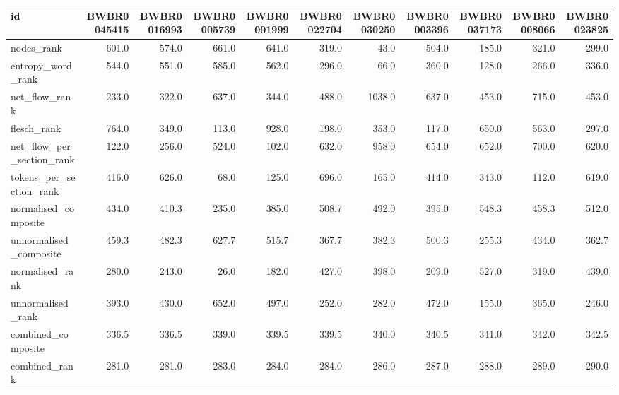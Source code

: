 \begin{tabular}{lrrrrrrrrrr}
\toprule
id & BWBR0045415 & BWBR0016993 & BWBR0005739 & BWBR0001999 & BWBR0022704 & BWBR0030250 & BWBR0003396 & BWBR0037173 & BWBR0008066 & BWBR0023825 \\
\midrule
nodes\_rank & 601.0 & 574.0 & 661.0 & 641.0 & 319.0 & 43.0 & 504.0 & 185.0 & 321.0 & 299.0 \\
\cline{1-11}
entropy\_word\_rank & 544.0 & 551.0 & 585.0 & 562.0 & 296.0 & 66.0 & 360.0 & 128.0 & 266.0 & 336.0 \\
\cline{1-11}
net\_flow\_rank & 233.0 & 322.0 & 637.0 & 344.0 & 488.0 & 1038.0 & 637.0 & 453.0 & 715.0 & 453.0 \\
\cline{1-11}
flesch\_rank & 764.0 & 349.0 & 113.0 & 928.0 & 198.0 & 353.0 & 117.0 & 650.0 & 563.0 & 297.0 \\
\cline{1-11}
net\_flow\_per\_section\_rank & 122.0 & 256.0 & 524.0 & 102.0 & 632.0 & 958.0 & 654.0 & 652.0 & 700.0 & 620.0 \\
\cline{1-11}
tokens\_per\_section\_rank & 416.0 & 626.0 & 68.0 & 125.0 & 696.0 & 165.0 & 414.0 & 343.0 & 112.0 & 619.0 \\
\cline{1-11}
normalised\_composite & 434.0 & 410.3 & 235.0 & 385.0 & 508.7 & 492.0 & 395.0 & 548.3 & 458.3 & 512.0 \\
\cline{1-11}
unnormalised\_composite & 459.3 & 482.3 & 627.7 & 515.7 & 367.7 & 382.3 & 500.3 & 255.3 & 434.0 & 362.7 \\
\cline{1-11}
normalised\_rank & 280.0 & 243.0 & 26.0 & 182.0 & 427.0 & 398.0 & 209.0 & 527.0 & 319.0 & 439.0 \\
\cline{1-11}
unnormalised\_rank & 393.0 & 430.0 & 652.0 & 497.0 & 252.0 & 282.0 & 472.0 & 155.0 & 365.0 & 246.0 \\
\cline{1-11}
combined\_composite & 336.5 & 336.5 & 339.0 & 339.5 & 339.5 & 340.0 & 340.5 & 341.0 & 342.0 & 342.5 \\
\cline{1-11}
combined\_rank & 281.0 & 281.0 & 283.0 & 284.0 & 284.0 & 286.0 & 287.0 & 288.0 & 289.0 & 290.0 \\
\cline{1-11}
\bottomrule
\end{tabular}
